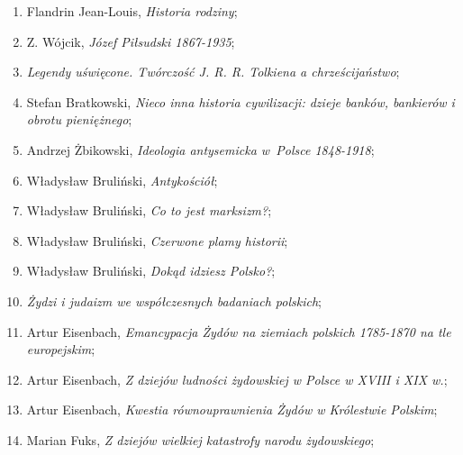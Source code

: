 \documentclass[a4paper,11pt]{article}
\begin{document}
\begin{enumerate}
\item Flandrin Jean-Louis, \textit{Historia rodziny};



\item Z. Wójcik, \textit{Józef Piłsudski 1867-1935};



\item \textit{Legendy uświęcone. Twórczość J. R. R. Tolkiena a
    chrześcijaństwo};



\item Stefan Bratkowski, \textit{Nieco inna historia cywilizacji: dzieje
    banków, bankierów i obrotu pieniężnego};



\item Andrzej Żbikowski, \textit{Ideologia antysemicka w~Polsce
    1848-1918};



\item Władysław Bruliński, \textit{Antykościół};



\item Władysław Bruliński, \textit{Co to jest marksizm?};



\item Władysław Bruliński, \textit{Czerwone plamy historii};



\item Władysław Bruliński, \textit{Dokąd idziesz Polsko?};



\item \textit{Żydzi i judaizm we współczesnych badaniach polskich};



\item Artur Eisenbach, \textit{Emancypacja Żydów na ziemiach polskich
    1785-1870 na tle europejskim};



\item Artur Eisenbach, \textit{Z dziejów ludności żydowskiej w Polsce w
    XVIII i XIX w.};



\item Artur Eisenbach, \textit{Kwestia równouprawnienia Żydów w
    Królestwie Polskim};



\item Marian Fuks, \textit{Z dziejów wielkiej katastrofy narodu
    żydowskiego};




\end{enumerate}
\end{document}
